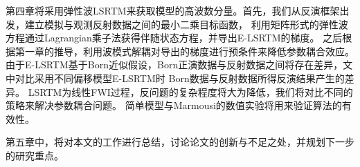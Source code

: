 第四章将采用弹性波LSRTM来获取模型的高波数分量。首先，我们从反演框架出发，建立模拟与观测反射数据之间的最小二乘目标函数，
利用矩阵形式的弹性波方程通过Lagrangian乘子法获得伴随状态方程，并导出E-LSRTM的梯度。
之后根据第一章的推导，利用波模式解耦对导出的梯度进行预条件来降低参数耦合效应。
由于E-LSRTM基于Born近似假设，Born正演数据与反射数据之间将存在差异，文中对比采用不同偏移模型E-LSRTM时
Born数据与反射数据所得反演结果产生的差异。
LSRTM为线性FWI过程，反问题的复杂程度将大为降低，我们将对比不同的策略来解决参数耦合问题。
简单模型与Marmousi的数值实验将用来验证算法的有效性。

第五章中，将对本文的工作进行总结，讨论论文的创新与不足之处，并规划下一步的研究重点。
